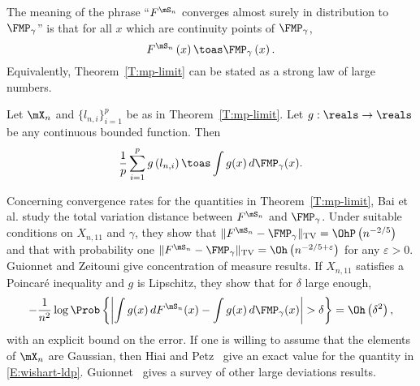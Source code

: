 The meaning of the phrase ``$F^{\mS_n}$ converges almost surely in distribution to $\FMP_\gamma$'' is that for all $x$ which are continuity points of $\FMP_\gamma$,
\begin{equation}\label{E:spectral-measure-limit-point}
    F^{\mS_n} \left(
        x
    \right)
    \toas
    \FMP_\gamma \left(
        x
    \right).
\end{equation}
Equivalently, Theorem~\ref{T:mp-limit} can be stated as a strong law of large numbers.

\begin{corollary}\label{C:wishart-lln}
    Let $\mX_n$ and $\{ l_{n,i} \}_{i=1}^{p}$ be as in 
    Theorem~\ref{T:mp-limit}.  Let $g : \reals \to \reals$ be any
    continuous bounded function.  Then
    \begin{equation}\label{E:wishart-functional-limit}
        \frac{1}{p}
        \sum_{i=1}^p
            g \left( l_{n,i} \right)
        \toas
        \int
            g(x)
            \,
            d\FMP_\gamma ( x ).
    \end{equation}
\end{corollary}

Concerning convergence rates for the quantities in Theorem~\ref{T:mp-limit},  Bai et al. \cite{bai2003crs} study the total variation distance between $F^{\mS_n}$ and $\FMP_\gamma$.  Under suitable conditions on $X_{n,11}$ and $\gamma$, they show that
\(
    \| F^{\mS_n} - \FMP_\gamma \|_\text{TV}
    =
    \OhP\left( n^{-2/5} \right)
\)
and that with probability one
\(
    \| F^{\mS_n} - \FMP_\gamma \|_\text{TV}
    =
    \Oh\left( n^{-2/5 + \varepsilon} \right)
\)
for any $\varepsilon > 0$.
Guionnet and Zeitouni \cite{guionnet2000csm} give concentration of measure results.  If $X_{n,11}$ satisfies a Poincar\'e inequality and $g$ is Lipschitz, they show that for $\delta$ large enough,
\begin{equation}\label{E:wishart-ldp}
    -
    \frac{1}{n^2}
    \log \Prob\left\{ 
        \left|
            \int g(x) \, dF^{\mS_n}(x) - \int g(x) \, d\FMP_\gamma(x)
        \right|
        >
        \delta
    \right\}
    =
    \Oh\left(
        \delta^2
    \right),
\end{equation}
with an explicit bound on the error. If one is willing to assume that the elements of $\mX_n$ are Gaussian, then Hiai and Petz~\cite{hiai1998edw} give an exact value for the quantity in \eqref{E:wishart-ldp}.  Guionnet~\cite{guionnetlds} gives a survey of other large deviations results.  

